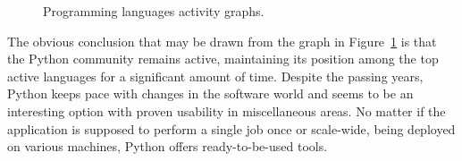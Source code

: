 \begin{figure}[ht]
  \begin{center}
  \end{center}
  \caption{Programming languages activity graphs.}
  \label{fig:ohloh_lang_graph}
\end{figure}
The obvious conclusion that may be drawn from the graph in Figure~\ref{fig:ohloh_lang_graph} is that the Python community remains active, maintaining its position among the top active languages for a significant amount of time. Despite the passing years, Python keeps pace with changes in the software world and seems to be an interesting option with proven usability in miscellaneous areas. No matter if the application is supposed to perform a single job once or scale-wide, being deployed on various machines, Python offers ready-to-be-used tools.
 
